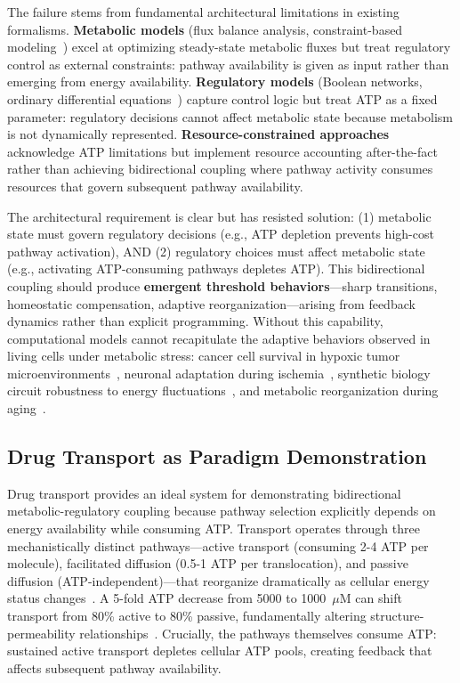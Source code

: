 \documentclass[10pt,letterpaper]{article}
\begin{document}
The failure stems from fundamental architectural limitations in existing formalisms. \textbf{Metabolic models} (flux balance analysis, constraint-based modeling~\cite{Orth2010,Varma1994}) excel at optimizing steady-state metabolic fluxes but treat regulatory control as external constraints: pathway availability is given as input rather than emerging from energy availability. \textbf{Regulatory models} (Boolean networks, ordinary differential equations~\cite{Chaouiya2008,Karlebach2008}) capture control logic but treat ATP as a fixed parameter: regulatory decisions cannot affect metabolic state because metabolism is not dynamically represented. \textbf{Resource-constrained approaches}~\cite{Beg2007,Genovese2021} acknowledge ATP limitations but implement resource accounting after-the-fact rather than achieving bidirectional coupling where pathway activity consumes resources that govern subsequent pathway availability.

The architectural requirement is clear but has resisted solution: (1) metabolic state must govern regulatory decisions (e.g., ATP depletion prevents high-cost pathway activation), AND (2) regulatory choices must affect metabolic state (e.g., activating ATP-consuming pathways depletes ATP). This bidirectional coupling should produce \textbf{emergent threshold behaviors}—sharp transitions, homeostatic compensation, adaptive reorganization—arising from feedback dynamics rather than explicit programming. Without this capability, computational models cannot recapitulate the adaptive behaviors observed in living cells under metabolic stress: cancer cell survival in hypoxic tumor microenvironments~\cite{Vaupel1989,Vander2009}, neuronal adaptation during ischemia~\cite{Lipton1999,Dirnagl1999}, synthetic biology circuit robustness to energy fluctuations~\cite{Brophy2014}, and metabolic reorganization during aging~\cite{Lopez2013}.

\subsection{Drug Transport as Paradigm Demonstration}

Drug transport provides an ideal system for demonstrating bidirectional metabolic-regulatory coupling because pathway selection explicitly depends on energy availability while consuming ATP. Transport operates through three mechanistically distinct pathways---active transport (consuming 2-4 ATP per molecule), facilitated diffusion (0.5-1 ATP per translocation), and passive diffusion (ATP-independent)---that reorganize dramatically as cellular energy status changes~\cite{Halestrap2013,Zhou2001}. A 5-fold ATP decrease from 5000 to 1000~$\mu$M can shift transport from 80\% active to 80\% passive, fundamentally altering structure-permeability relationships~\cite{Lipton1999,Vaupel1989}. Crucially, the pathways themselves consume ATP: sustained active transport depletes cellular ATP pools, creating feedback that affects subsequent pathway availability.
\end{document}

